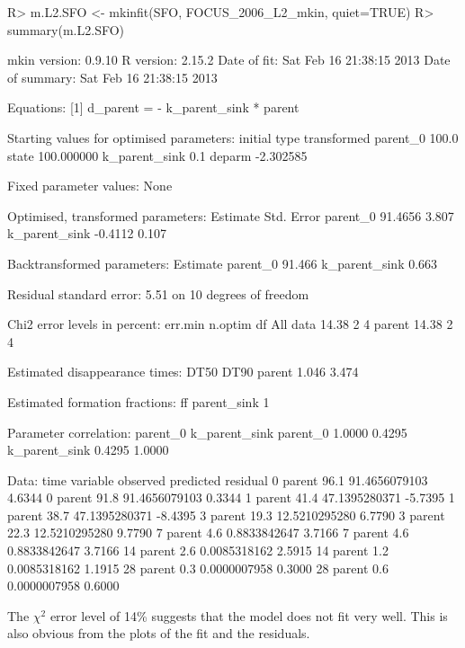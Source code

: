 \documentclass[12pt,a4paper]{article}
\begin{document}
\begin{Schunk}
\begin{Sinput}
R> m.L2.SFO <- mkinfit(SFO, FOCUS_2006_L2_mkin, quiet=TRUE)
R> summary(m.L2.SFO)
\end{Sinput}
\begin{Soutput}
mkin version:    0.9.10 
R version:       2.15.2 
Date of fit:     Sat Feb 16 21:38:15 2013 
Date of summary: Sat Feb 16 21:38:15 2013 

Equations:
[1] d_parent = - k_parent_sink * parent

Starting values for optimised parameters:
              initial   type transformed
parent_0        100.0  state  100.000000
k_parent_sink     0.1 deparm   -2.302585

Fixed parameter values:
None

Optimised, transformed parameters:
              Estimate Std. Error
parent_0       91.4656      3.807
k_parent_sink  -0.4112      0.107

Backtransformed parameters:
              Estimate
parent_0        91.466
k_parent_sink    0.663

Residual standard error: 5.51 on 10 degrees of freedom

Chi2 error levels in percent:
         err.min n.optim df
All data   14.38       2  4
parent     14.38       2  4

Estimated disappearance times:
        DT50  DT90
parent 1.046 3.474

Estimated formation fractions:
            ff
parent_sink  1

Parameter correlation:
              parent_0 k_parent_sink
parent_0        1.0000        0.4295
k_parent_sink   0.4295        1.0000

Data:
 time variable observed     predicted residual
    0   parent     96.1 91.4656079103   4.6344
    0   parent     91.8 91.4656079103   0.3344
    1   parent     41.4 47.1395280371  -5.7395
    1   parent     38.7 47.1395280371  -8.4395
    3   parent     19.3 12.5210295280   6.7790
    3   parent     22.3 12.5210295280   9.7790
    7   parent      4.6  0.8833842647   3.7166
    7   parent      4.6  0.8833842647   3.7166
   14   parent      2.6  0.0085318162   2.5915
   14   parent      1.2  0.0085318162   1.1915
   28   parent      0.3  0.0000007958   0.3000
   28   parent      0.6  0.0000007958   0.6000
\end{Soutput}
\end{Schunk}

The $\chi^2$ error level of 14\% suggests that the model does not fit very well.
This is also obvious from the plots of the fit and the residuals.
\end{document}
